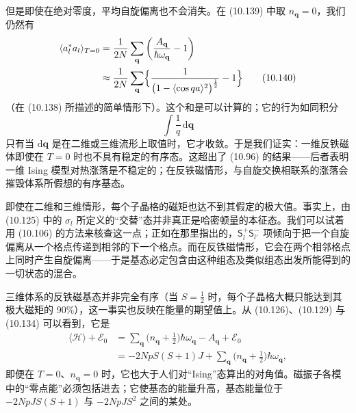 但是即使在绝对零度，平均自旋偏离也不会消失。在 (10.139) 中取 $n_{\mathbf{q}} = 0$，我们仍然有
\begin{align*}
\langle a_l^* a_l\rangle_{T=0} &= \frac{1}{2N}\sum_{\mathbf{q}} \left( \frac{A_{\mathbf{q}}}{\hbar\omega_{\mathbf{q}}} - 1 \right) \\
&\approx \frac{1}{2N}\sum_{\mathbf{q}} \Bigl\{ \frac{1}{\bigl(1 - \langle\cos qa\rangle^2\bigr)^{\frac{1}{2}}} - 1 \Bigr\} \tag{10.140}
\end{align*}
（在 (10.138) 所描述的简单情形下）。这个和是可以计算的；它的行为如同积分
\begin{equation*}
\int \frac{1}{q}\,\mathrm{d}\mathbf{q} \tag{10.141}
\end{equation*}
只有当 $\mathrm{d}\mathbf{q}$ 是在二维或三维流形上取值时，它才收敛。于是我们证实：一维反铁磁体即使在 $T = 0$ 时也不具有稳定的有序态。这超出了 (10.96) 的结果——后者表明一维 Ising 模型对热涨落是不稳定的；在反铁磁情形，与自旋交换相联系的涨落会摧毁体系所假想的有序基态。


即使在二维和三维情形，每个子晶格的磁矩也达不到其假定的极大值。事实上，由 (10.125) 中的 $\sigma_l$ 所定义的“交替”态并非真正是哈密顿量的本征态。我们可以试着用 (10.106) 的方法来核查这一点；正如在那里指出的，$\mathsf{S}_l^+ \mathsf{S}_{l'}^-$ 项倾向于把一个自旋偏离从一个格点传递到相邻的下一个格点。而在反铁磁情形，它会在两个相邻格点上同时产生自旋偏离——于是基态必定包含由这种组态及类似组态出发所能得到的一切状态的混合。

三维体系的反铁磁基态并非完全有序（当 $S = \tfrac{1}{2}$ 时，每个子晶格大概只能达到其极大磁矩的 90\%），这一事实也反映在能量的期望值上。从 (10.126)、(10.129) 与 (10.134) 可以看到，它是
\begin{align*}
\langle\mathcal{H}\rangle + \mathcal{E}_0 &= \sum_{\mathbf{q}} \bigl( n_{\mathbf{q}} + \tfrac{1}{2} \bigr) \hbar\omega_{\mathbf{q}} - A_{\mathbf{q}} + \mathcal{E}_0 \\
&= -2NpS(S+1)J + \sum_{\mathbf{q}} \bigl( n_{\mathbf{q}} + \tfrac{1}{2} \bigr) \hbar\omega_{\mathbf{q}}, \tag{10.142}
\end{align*}
即便在 $T = 0$、$n_{\mathbf{q}} = 0$ 时，它也大于人们对“Ising”态算出的对角值。磁振子各模中的“零点能”必须包括进去；它使基态的能量升高，基态能量位于 $-2NpJS(S+1)$ 与 $-2NpJS^2$ 之间的某处。


